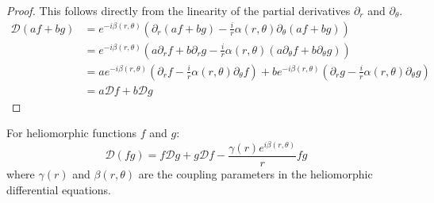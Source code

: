 \begin{proof}
This follows directly from the linearity of the partial derivatives $\partial_r$ and $\partial_\theta$.
\begin{align}
\mathcal{D}(af + bg) &= e^{-i\beta(r,\theta)}\left(\partial_r(af + bg) - \frac{i}{r}\alpha(r,\theta)\partial_\theta(af + bg)\right)\\
&= e^{-i\beta(r,\theta)}\left(a\partial_rf + b\partial_rg - \frac{i}{r}\alpha(r,\theta)(a\partial_\theta f + b\partial_\theta g)\right)\\
&= ae^{-i\beta(r,\theta)}\left(\partial_rf - \frac{i}{r}\alpha(r,\theta)\partial_\theta f\right) + be^{-i\beta(r,\theta)}\left(\partial_rg - \frac{i}{r}\alpha(r,\theta)\partial_\theta g\right)\\
&= a\mathcal{D}f + b\mathcal{D}g
\end{align}
\end{proof}

\begin{theorem}
For heliomorphic functions $f$ and $g$:
\begin{equation}
\mathcal{D}(fg) = f\mathcal{D}g + g\mathcal{D}f - \frac{\gamma(r)e^{i\beta(r,\theta)}}{r}fg
\end{equation}
where $\gamma(r)$ and $\beta(r,\theta)$ are the coupling parameters in the heliomorphic differential equations.
\end{theorem}

